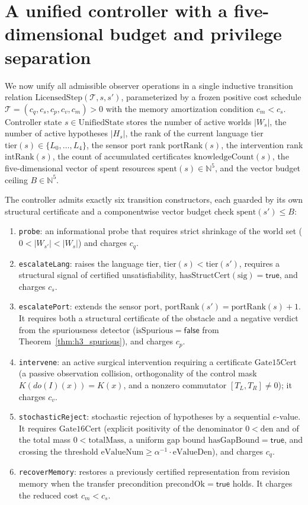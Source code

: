 \documentclass[11pt,a4paper]{article}
\theoremstyle{cleanthm}
\DeclareRobustCommand{\id}[1]{\allowbreak\nolinkurl{#1}\allowbreak}
\begin{document}
\section{A unified controller with a five-dimensional budget and privilege separation}
We now unify all admissible observer operations in a single inductive transition relation $\mathrm{LicensedStep}(\mathcal T,s,s')$, parameterized by a frozen positive cost schedule $\mathcal T=(c_q,c_s,c_p,c_v,c_m)>0$ with the memory amortization condition $c_m<c_s$. Controller state $s\in\mathrm{UnifiedState}$ stores the number of active worlds $|W_s|$, the number of active hypotheses $|H_s|$, the rank of the current language tier $\mathrm{tier}(s)\in\{L_0,\dots,L_4\}$, the sensor port rank $\mathrm{portRank}(s)$, the intervention rank $\mathrm{intRank}(s)$, the count of accumulated certificates $\mathrm{knowledgeCount}(s)$, the five-dimensional vector of spent resources $\mathrm{spent}(s)\in\mathbb N^5$, and the vector budget ceiling $B\in\mathbb N^5$.

The controller admits exactly six transition constructors, each guarded by its own structural certificate and a componentwise vector budget check $\mathrm{spent}(s')\le B$:
\begin{enumerate}
\item \id{probe}: an informational probe that requires strict shrinkage of the world set ($0<|W_{s'}|<|W_s|$) and charges $c_q$.
\item \id{escalateLang}: raises the language tier, $\mathrm{tier}(s)<\mathrm{tier}(s')$, requires a structural signal of certified unsatisfiability, $\mathrm{hasStructCert}(\mathrm{sig})=\mathsf{true}$, and charges $c_s$.
\item \id{escalatePort}: extends the sensor port, $\mathrm{portRank}(s')=\mathrm{portRank}(s)+1$. It requires both a structural certificate of the obstacle and a negative verdict from the spuriousness detector ($\mathrm{isSpurious}=\mathsf{false}$ from Theorem~\ref{thm:h3_spurious}), and charges $c_p$.
\item \id{intervene}: an active surgical intervention requiring a certificate $\mathrm{Gate15Cert}$ (a passive observation collision, orthogonality of the control mask $K(do(I)(x))=K(x)$, and a nonzero commutator $[T_L,T_R]\ne0$); it charges $c_v$.
\item \id{stochasticReject}: stochastic rejection of hypotheses by a sequential $e$-value. It requires $\mathrm{Gate16Cert}$ (explicit positivity of the denominator $0<\mathrm{den}$ and of the total mass $0<\mathrm{totalMass}$, a uniform gap bound $\mathrm{hasGapBound}=\mathsf{true}$, and crossing the threshold $\mathrm{eValueNum}\ge\alpha^{-1}\cdot\mathrm{eValueDen}$), and charges $c_q$.
\item \id{recoverMemory}: restores a previously certified representation from revision memory when the transfer precondition $\mathrm{precondOk}=\mathsf{true}$ holds. It charges the reduced cost $c_m<c_s$.
\end{enumerate}
\end{document}
